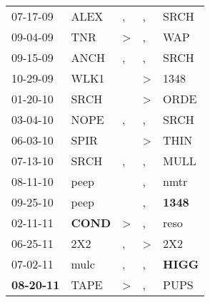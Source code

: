 \begin{supertabular}{p{0.07\textwidth}p{0.06\textwidth}p{0.02\textwidth}p{0.02\textwidth}p{0.06\textwidth}}
          07-17-09\textsuperscript{} &           ALEX\textsuperscript{} &                , &                , &           SRCH\textsuperscript{} \\
          09-04-09\textsuperscript{} &            TNR\textsuperscript{} &     \textgreater &                , &            WAP\textsuperscript{} \\
          09-15-09\textsuperscript{} &           ANCH\textsuperscript{} &                , &                , &           SRCH\textsuperscript{} \\
          10-29-09\textsuperscript{} &           WLK1\textsuperscript{} &                  &     \textgreater &           1348\textsuperscript{} \\
          01-20-10\textsuperscript{} &           SRCH\textsuperscript{} &                  &     \textgreater &           ORDE\textsuperscript{} \\
          03-04-10\textsuperscript{} &           NOPE\textsuperscript{} &                , &                , &           SRCH\textsuperscript{} \\
          06-03-10\textsuperscript{} &           SPIR\textsuperscript{} &                  &     \textgreater &           THIN\textsuperscript{} \\
          07-13-10\textsuperscript{} &           SRCH\textsuperscript{} &                , &                , &           MULL\textsuperscript{} \\
          08-11-10\textsuperscript{} &           peep\textsuperscript{} &                  &                , &           nmtr\textsuperscript{} \\
          09-25-10\textsuperscript{} &           peep\textsuperscript{} &                  &                , &  \textbf{1348\textsuperscript{}} \\
          02-11-11\textsuperscript{} &  \textbf{COND\textsuperscript{}} &     \textgreater &                , &           reso\textsuperscript{} \\
          06-25-11\textsuperscript{} &            2X2\textsuperscript{} &                , &     \textgreater &            2X2\textsuperscript{} \\
          07-02-11\textsuperscript{} &           mulc\textsuperscript{} &                , &                , &  \textbf{HIGG\textsuperscript{}} \\
 \textbf{08-20-11\textsuperscript{}} &           TAPE\textsuperscript{} &     \textgreater &                , &           PUPS\textsuperscript{} \\

\end{supertabular}
